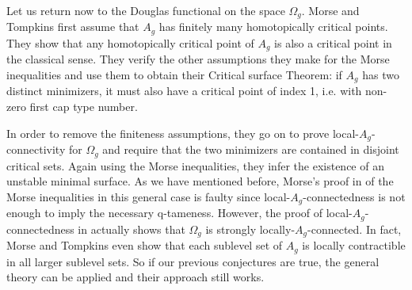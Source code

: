 Let us return now to the Douglas functional on the space $\Omega_g$.
Morse and Tompkins first assume that $A_g$ has finitely many homotopically critical points. They show that any homotopically critical point of $A_g$ is also a critical point in the classical sense.
They verify the other assumptions they make for the Morse inequalities and use them to obtain their Critical surface Theorem: if $A_g$ has two distinct minimizers, it must also have a critical point of index 1, i.e. with non-zero first cap type number.

In order to remove the finiteness assumptions, they go on to prove local-$A_g$-connectivity for $\Omega_g$ and require that the two minimizers are contained in disjoint critical sets. Again using the Morse inequalities, they infer the existence of an unstable minimal surface.
As we have mentioned before, Morse's proof in \cite{Morse.1940} of the Morse inequalities in this general case is faulty since local-$A_g$-connectedness is not enough to imply the necessary q-tameness.
However, the proof of local-$A_g$-connectedness in \cite{Morse.1939} actually shows that $\Omega_g$ is strongly locally-$A_g$-connected. In fact, Morse and Tompkins even show that each sublevel set of $A_g$ is locally contractible in all larger sublevel sets.
So if our previous conjectures are true, the general theory can be applied and their approach still works.



